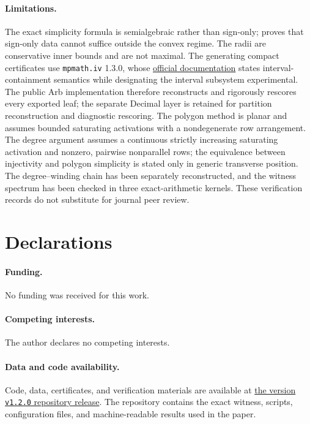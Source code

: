 \documentclass[11pt,twoside,leqno]{article}
\theoremstyle{plain}
\theoremstyle{definition}
\theoremstyle{remark}
\begin{document}
\paragraph{Limitations.} The exact simplicity formula is semialgebraic rather than sign-only;  proves that sign-only data cannot suffice outside the convex regime. The radii are conservative inner bounds and are not maximal. The generating compact certificates use \texttt{mpmath.iv} 1.3.0, whose \href{https://mpmath.org/doc/current/contexts.html}{official documentation} states interval-containment semantics while designating the interval subsystem experimental. The public Arb implementation therefore reconstructs and rigorously rescores every exported leaf; the separate Decimal layer is retained for partition reconstruction and diagnostic rescoring. The polygon method is planar and assumes bounded saturating activations with a nondegenerate row arrangement. The degree argument assumes a continuous strictly increasing saturating activation and nonzero, pairwise nonparallel rows; the equivalence between injectivity and polygon simplicity is stated only in generic transverse position. The degree--winding chain has been separately reconstructed, and the witness spectrum has been checked in three exact-arithmetic kernels. These verification records do not substitute for journal peer review.

\section*{Declarations}
\paragraph{Funding.} No funding was received for this work.
\paragraph{Competing interests.} The author declares no competing interests.
\paragraph{Data and code availability.} Code, data, certificates, and
verification materials are available at
\href{https://github.com/lmdixon23/njc-2026-cluster-inversion/releases/tag/v1.2.0}{the version \texttt{v1.2.0} repository release}. The repository contains the exact witness,
scripts, configuration files, and machine-readable results used in the paper.
\end{document}
